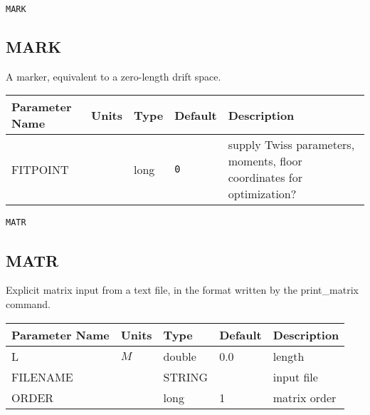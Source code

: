 \begin{latexonly}
\newpage
\begin{center}{\Large\verb|MARK|}\end{center}
\end{latexonly}\subsection{MARK}
A marker, equivalent to a zero-length drift space.
\\
\begin{tabular}{|l|l|l|l|p{\descwidth}|} \hline
Parameter Name & Units & Type & Default & Description \\ \hline 
FITPOINT &  & long &  \verb|0| & supply Twiss parameters, moments, floor coordinates for optimization?  \\ \hline 
\end{tabular}

\begin{latexonly}
\newpage
\begin{center}{\Large\verb|MATR|}\end{center}
\end{latexonly}\subsection{MATR}
Explicit matrix input from a text file, in the format written by the print\_matrix
command.
\\
\begin{tabular}{|l|l|l|l|p{\descwidth}|} \hline
Parameter Name & Units & Type & Default & Description \\ \hline 
L & $M$ & double &  0.0 & length  \\ \hline 
FILENAME &  & STRING &                   & input file  \\ \hline 
ORDER &  & long &   1               & matrix order  \\ \hline 
\end{tabular}

